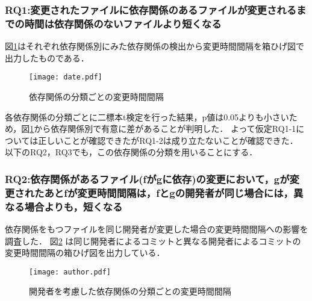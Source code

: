 \documentclass{fose2016}           %
\begin{document}
\subsubsection*{RQ1:変更されたファイルに依存関係のあるファイルが変更されるまでの時間は依存関係のないファイルより短くなる}
図\ref{fig:subdate}はそれぞれ依存関係別にみた依存関係の検出から変更時間間隔を箱ひげ図で出力したものである．　　

\begin{figure}[t]
\centering
\texttt{[image: date.pdf]}
\caption{依存関係の分類ごとの変更時間間隔}
\label{fig:subdate} 
\end{figure}

各依存関係の分類ごとに二標本t検定を行った結果，p値は0.05よりも小さいため，図\ref{fig:subdate}から依存関係別で有意に差があることが判明した．
よって仮定RQ1-1については正しいことが確認できたがRQ1-2は成り立たないことが確認できた．
以下のRQ2，RQ3でも，この依存関係の分類を用いることにする．


\subsubsection*{RQ2:依存関係があるファイル(fがgに依存)の変更において，gが変更されたあとfが変更時間間隔は，fとgの開発者が同じ場合には，異なる場合よりも，短くなる}
依存関係をもつファイルを同じ開発者が変更した場合の変更時間間隔への影響を調査した．
図\ref{fig:author_subdate} は同じ開発者によるコミットと異なる開発者によるコミットの変更時間間隔の箱ひげ図を出力している．


\begin{figure}[t]
\centering
\texttt{[image: author.pdf]}
\caption{開発者を考慮した依存関係の分類ごとの変更時間間隔}
\label{fig:author_subdate} 
\end{figure}
\end{document}
